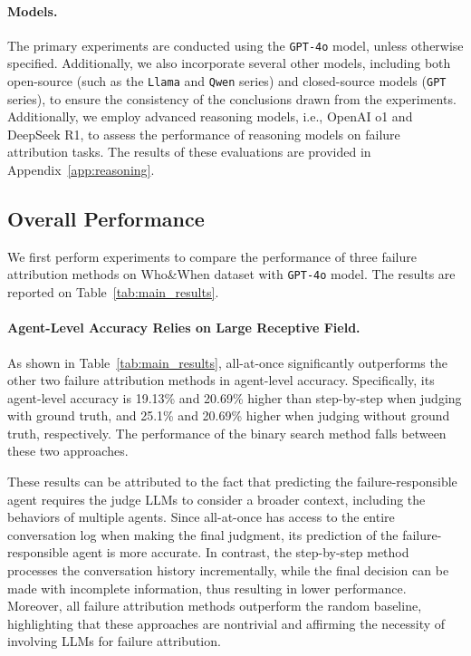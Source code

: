 \paragraph{Models.} 
The primary experiments are conducted using the \texttt{GPT-4o} model, unless otherwise specified. Additionally, we also incorporate several other models, including both open-source (such as the \texttt{Llama} and \texttt{Qwen} series) and closed-source models (\texttt{GPT} series), to ensure the consistency of the conclusions drawn from the experiments.
Additionally, we employ advanced reasoning models, i.e., OpenAI o1 and DeepSeek R1, to assess the performance of reasoning models on failure attribution tasks. The results of these evaluations are provided in Appendix~\ref{app:reasoning}.



\subsection{Overall Performance}
We first perform experiments to compare the performance of three failure attribution methods on Who\&When dataset with \texttt{GPT-4o} model. 
The results are reported on Table~\ref{tab:main_results}. 
\paragraph{Agent-Level Accuracy Relies on Large Receptive Field.} 

As shown in Table~\ref{tab:main_results}, all-at-once significantly outperforms the other two failure attribution methods in agent-level accuracy. 
Specifically, its agent-level accuracy is 19.13\% and 20.69\% higher than step-by-step when judging with ground truth, and 25.1\% and 20.69\% higher when judging without ground truth, respectively.
The performance of the binary search method falls between these two approaches.

These results can be attributed to the fact that predicting the failure-responsible agent requires the judge LLMs to consider a broader context, including the behaviors of multiple agents. Since all-at-once has access to the entire conversation log when making the final judgment, its prediction of the failure-responsible agent is more accurate. In contrast, the step-by-step method processes the conversation history incrementally, while the final decision can be made with incomplete information, thus resulting in lower performance. 
Moreover, all failure attribution methods outperform the random baseline, highlighting that these approaches are nontrivial and affirming the necessity of involving LLMs for failure attribution.

